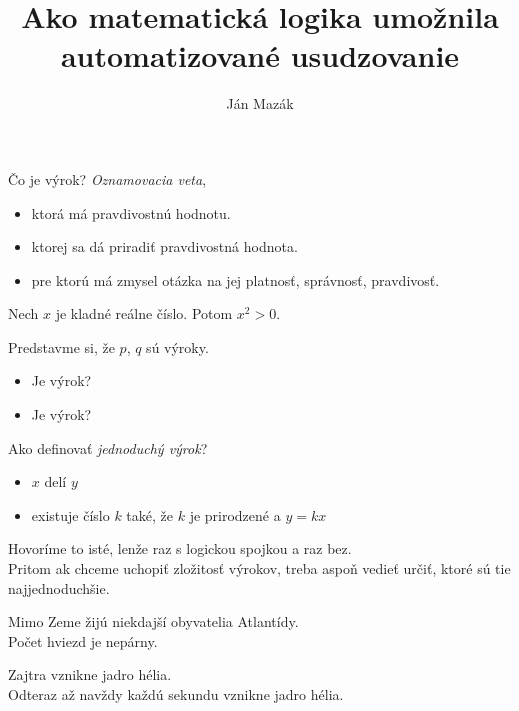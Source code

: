 \documentclass[12pt]{beamer}
\theoremstyle{definition}
\begin{document}
\title{Ako matematická logika umožnila automatizované usudzovanie}
\author{Ján Mazák}
\date{}
\frame{\titlepage}

\begin{frame}
Čo je výrok? \emph{Oznamovacia veta},
\begin{itemize}
	\item ktorá má pravdivostnú hodnotu.
	\item ktorej sa dá priradiť pravdivostná hodnota.
	\item pre ktorú má zmysel otázka na jej platnosť, správnosť, pravdivosť.
\end{itemize}
\end{frame}

\begin{frame}
Nech $x$ je kladné reálne číslo. Potom $x^2 > 0$.
\end{frame}

\begin{frame}
Predstavme si, že $p$, $q$ sú výroky.
\begin{itemize}
	\item Je  výrok?
	\item Je  výrok?
\end{itemize}
\end{frame}

\begin{frame}
Ako definovať \emph{jednoduchý výrok}? 
\begin{itemize}
	\item $x$ delí $y$
	\item existuje číslo $k$ také, že $k$ je prirodzené a $y = kx$
\end{itemize}
\vspace*{3mm}
Hovoríme to isté, lenže raz s logickou spojkou a raz bez.\\[6mm]

Pritom ak chceme uchopiť zložitosť výrokov, treba aspoň vedieť určiť, ktoré sú tie najjednoduchšie.
\end{frame}

\begin{frame}
Mimo Zeme žijú niekdajší obyvatelia Atlantídy.\\[5mm]
Počet hviezd je nepárny.
\end{frame}

\begin{frame}
Zajtra vznikne jadro hélia.\\[5mm]
\pause
Odteraz až navždy každú sekundu vznikne jadro hélia.
\end{frame}
\end{document}
